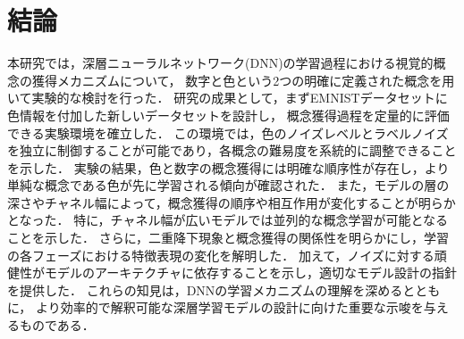 \chapter{結論}
本研究では，深層ニューラルネットワーク(DNN)の学習過程における視覚的概念の獲得メカニズムについて，
数字と色という2つの明確に定義された概念を用いて実験的な検討を行った．
研究の成果として，まずEMNISTデータセットに色情報を付加した新しいデータセットを設計し，
概念獲得過程を定量的に評価できる実験環境を確立した．
この環境では，色のノイズレベルとラベルノイズを独立に制御することが可能であり，各概念の難易度を系統的に調整できることを示した．
実験の結果，色と数字の概念獲得には明確な順序性が存在し，より単純な概念である色が先に学習される傾向が確認された．
また，モデルの層の深さやチャネル幅によって，概念獲得の順序や相互作用が変化することが明らかとなった．
特に，チャネル幅が広いモデルでは並列的な概念学習が可能となることを示した．
さらに，二重降下現象と概念獲得の関係性を明らかにし，学習の各フェーズにおける特徴表現の変化を解明した．
加えて，ノイズに対する頑健性がモデルのアーキテクチャに依存することを示し，適切なモデル設計の指針を提供した．
これらの知見は，DNNの学習メカニズムの理解を深めるとともに，
より効率的で解釈可能な深層学習モデルの設計に向けた重要な示唆を与えるものである．
